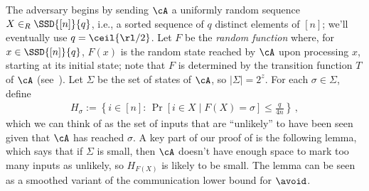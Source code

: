 \begin{itemize}
\begin{itemize}
 The adversary begins by sending $\cA$ a
uniformly random sequence $X \in_R \SSD{[n]}{q}$, i.e., a sorted sequence of
$q$ distinct elements of $[n]$; we'll eventually use $q = \ceil{\rl/2}$.  Let
$F$ be the {\em random function} where, for $x \in \SSD{[n]}{q}$, $F(x)$ is
the random state reached by $\cA$ upon processing $x$, starting at its initial
state; note that $F$ is determined by the transition function $T$ of $\cA$
(see~).  Let $\Sigma$ be the set of states of $\cA$, so
$|\Sigma| = 2^z$. For each $\sigma \in \Sigma$, define
\begin{align}
  H_{\sigma} := \left\{ i\in[n]:\, \Pr[i\in X \mid F(X) = \sigma] \le \frac{q}{4n} \right\} \,,
  \label{eq:H-def}
\end{align}
which we can think of as the set of inputs that are ``unlikely'' to have been
seen given that $\cA$ has reached $\sigma$.  A key part of our proof of
 is the following lemma, which says that if $\Sigma$
is small, then $\cA$ doesn't have enough space to mark too many inputs as
unlikely, so $H_{F(X)}$ is likely to be small. The lemma can be seen as a
smoothed variant of the communication lower bound for $\avoid$.


\end{itemize}
\end{itemize}
